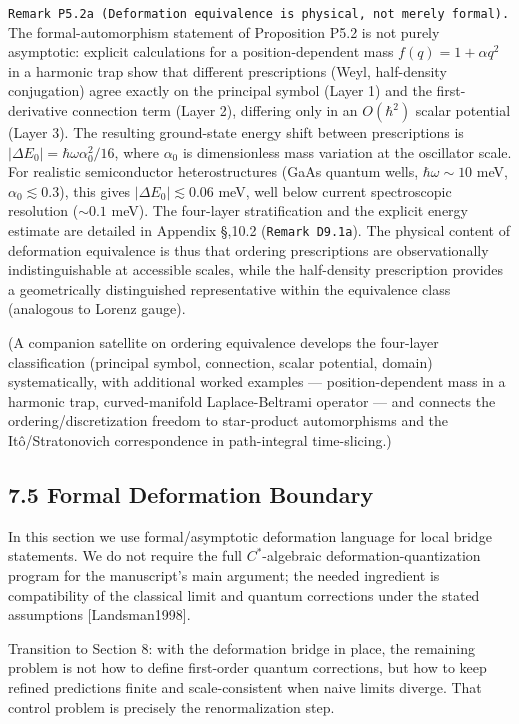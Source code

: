 \documentclass[
]{article}
\begin{document}
\texttt{Remark\ P5.2a\ (Deformation\ equivalence\ is\ physical,\ not\ merely\ formal).}
The formal-automorphism statement of Proposition P5.2 is not purely
asymptotic: explicit calculations for a position-dependent mass
\(f(q)=1+\alpha q^2\) in a harmonic trap show that different
prescriptions (Weyl, half-density conjugation) agree exactly on the
principal symbol (Layer 1) and the first-derivative connection term
(Layer 2), differing only in an \(O(\hbar^2)\) scalar potential (Layer
3). The resulting ground-state energy shift between prescriptions is
\(|\Delta E_0|=\hbar\omega\alpha_0^2/16\), where \(\alpha_0\) is
dimensionless mass variation at the oscillator scale. For realistic
semiconductor heterostructures (GaAs quantum wells,
\(\hbar\omega\sim 10\) meV, \(\alpha_0\lesssim 0.3\)), this gives
\(|\Delta E_0|\lesssim 0.06\) meV, well below current spectroscopic
resolution (\(\sim 0.1\) meV). The four-layer stratification and the
explicit energy estimate are detailed in Appendix \S,10.2
(\texttt{Remark\ D9.1a}). The physical content of deformation
equivalence is thus that ordering prescriptions are observationally
indistinguishable at accessible scales, while the half-density
prescription provides a geometrically distinguished representative
within the equivalence class (analogous to Lorenz gauge).

(A companion satellite on ordering equivalence develops the four-layer
classification (principal symbol, connection, scalar potential, domain)
systematically, with additional worked examples --- position-dependent
mass in a harmonic trap, curved-manifold Laplace-Beltrami operator ---
and connects the ordering/discretization freedom to star-product
automorphisms and the Itô/Stratonovich correspondence in path-integral
time-slicing.)

\subsection{7.5 Formal Deformation
Boundary}\label{formal-deformation-boundary}

In this section we use formal/asymptotic deformation language for local
bridge statements. We do not require the full \(C^\ast\)-algebraic
deformation-quantization program for the manuscript's main argument; the
needed ingredient is compatibility of the classical limit and quantum
corrections under the stated assumptions {[}Landsman1998{]}.

Transition to Section 8: with the deformation bridge in place, the
remaining problem is not how to define first-order quantum corrections,
but how to keep refined predictions finite and scale-consistent when
naive limits diverge. That control problem is precisely the
renormalization step.
\end{document}
